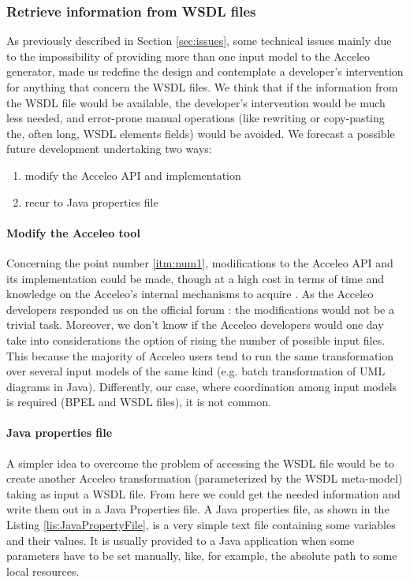 \subsubsection{Retrieve information from WSDL files}
\label{sec:FutRetrieveWSDLInfo}
As previously described in Section \ref{sec:issues}, some technical issues mainly due to the impossibility of providing more than one input model to the Acceleo generator, made us redefine the design and contemplate a developer's intervention 
for anything that concern the WSDL files.
We think that if the information from the WSDL file would be available, the developer's intervention would be much less needed, and error-prone manual operations (like rewriting or copy-pasting the, often long, WSDL elements fields) would be avoided. 
We forecast a possible future development undertaking two ways:
\begin{enumerate}
 \item \label{itm:num1}modify the Acceleo API and implementation
 \item \label{itm:num2}recur to Java properties file 
\end{enumerate}

\paragraph{Modify the Acceleo tool}
Concerning the point number \ref{itm:num1}, modifications to the Acceleo API and its implementation could be made, though at a high cost in terms of time and knowledge on the Acceleo's internal mechanisms to acquire . As the Acceleo developers responded us on the official forum \cite{acceleoForum}: the modifications would not be a trivial task.
Moreover, we don't know if the Acceleo developers would one day take into considerations the option of rising the number of possible input files. This because the majority of Acceleo users tend to run the same transformation over several input models of the same kind (e.g. batch transformation of UML diagrams in Java). Differently, our case, where coordination among input models is required (BPEL and WSDL files), it is not common.

\paragraph{Java properties file}
A simpler idea to overcome the problem of accessing the WSDL file would be to create another Acceleo transformation (parameterized by the WSDL meta-model) taking as input a WSDL file. From here we could get the needed information and write them out in a Java Properties file. A Java properties file, as shown in the Listing \ref{lis:JavaPropertyFile}, is a very simple text file containing some variables and their values. It is usually provided to a Java application when some parameters have to be set manually, like, for example, the absolute path to some local resources.

